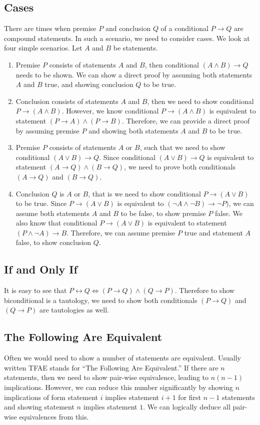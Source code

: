 \documentclass[a4paper,english,12pt]{article}
\begin{document}
\subsection{Cases}
There are times when premise $P$ and conclusion $Q$ of a conditional $P \rightarrow Q$ are compound statements. In such a scenario, we need to consider cases. We look at four simple scenarios. Let $A$ and $B$ be statements.
\begin{enumerate}[i]
\item Premise $P$ consists of statements $A$ and $B$, then conditional $(A \wedge B) \rightarrow Q$ needs to be shown. We can show a direct proof by assuming both statements $A$ and $B$ true, and showing conclusion $Q$ to be true.
\item Conclusion consists of statements $A$ and $B$, then we need to show conditional $P \rightarrow (A \wedge B)$. However, we know conditional $P \rightarrow (A \wedge B)$ is equivalent to statement $(P \rightarrow A)  \wedge (P \rightarrow B)$. Therefore, we can provide a direct proof by assuming premise $P$ and showing both statements $A$ and $B$ to be true.
\item Premise $P$ consists of statements $A$ or $B$, such that we need to show conditional $(A \vee B) \rightarrow Q$. Since conditional $(A \vee B) \rightarrow Q$ is equivalent to statement $(A \rightarrow Q) \wedge (B \rightarrow Q)$, we need to prove both conditionals $(A \rightarrow Q)$ and $(B \rightarrow Q)$.
\item Conclusion $Q$ is $A$ or $B$, that is we need to show conditional $P \rightarrow (A \vee B)$ to be true. Since $P \rightarrow (A \vee B)$ is equivalent to $(\neg A \wedge \neg B) \rightarrow \neg P)$,  we can assume both  statements $A$ and $B$ to be false, to show premise $P$ false. We also know that conditional $P \rightarrow (A \vee B)$ is equivalent to statement $(P\wedge \neg A) \rightarrow B$. Therefore, we can assume premise $P$ true and statement $A$ false, to show conclusion $Q$.
\end{enumerate}
\subsection{If and Only If}
It is easy to see that $P \leftrightarrow Q \Leftrightarrow (P \rightarrow Q)\wedge(Q \rightarrow P)$. Therefore to show biconditional is a tautology, we need to show both conditionals $(P \rightarrow Q)$ and $(Q \rightarrow P)$ are tautologies as well.
\subsection{The Following Are Equivalent}
Often we would need to show a number of statements are equivalent. Usually written TFAE stands for ``The Following Are Equivalent.'' If there are $n$ statements, then we need to show pair-wise equivalence, leading to $n(n-1)$ implications. However, we can reduce this number significantly by showing $n$ implications of form statement $i$ implies statement $i+1$ for first $n-1$ statements and showing statement $n$ implies statement $1$. We can logically deduce all pair-wise equivalences from this.
 
\end{document}
